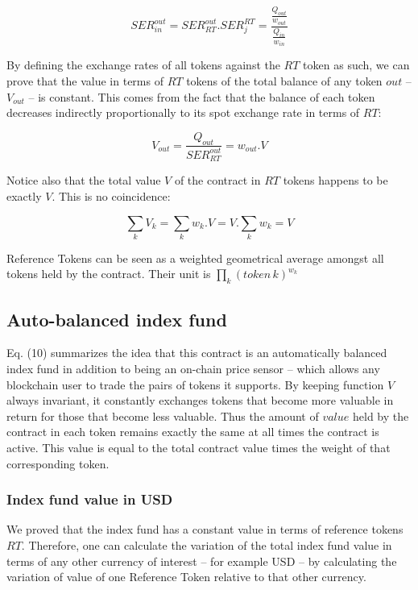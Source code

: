 \documentclass[11pt]{amsart}
\begin{document}
\begin{equation}
SER^{out}_{in} = SER^{out}_{RT}.SER^{RT}_{j} = \frac{\frac{Q_{out}}{w_{out}}}{\frac{Q_{in}}{w_{in}}}
\end{equation}

By defining the exchange rates of all tokens against the $RT$ token as such, we can prove that the value in terms of $RT$ tokens of the total balance of any token $out$ -- $V_{out}$ -- is constant. This comes from the fact that the balance of each token decreases indirectly proportionally to its spot exchange rate in terms of $RT$:

\begin{equation}
V_{out} = \frac{Q_{out}}{SER^{out}_{RT}} = w_{out}.V 
\end{equation}

Notice also that the total value $V$ of the contract in  $RT$ tokens happens to be exactly $V$. This is no coincidence:

\begin{equation}
\sum_{k}V_k = \sum_{k}w_k.V = V.\sum_{k}w_k = V
\end{equation}

Reference Tokens can be seen as a weighted geometrical average amongst all tokens held by the contract. Their unit is $\prod_{k}(token\,k)^{w_k}$

\subsection{Auto-balanced index fund}

Eq. (10) summarizes the idea that this contract is an automatically balanced index fund in addition to being an on-chain price sensor -- which allows any blockchain user to trade the pairs of tokens it supports. By keeping function $V$ always invariant, it constantly exchanges tokens that become more valuable in return for those that become less valuable. Thus the amount of $value$ held by the contract in each token remains exactly the same at all times the contract is active. This value is equal to the total contract value times the weight of that corresponding token.

\subsubsection{Index fund value in USD}
We proved that the index fund has a constant value in terms of reference tokens $RT$. Therefore, one can calculate the variation of the total index fund value in terms of any other currency of interest -- for example USD -- by calculating the variation of value of one Reference Token relative to that other currency. 
\end{document}
